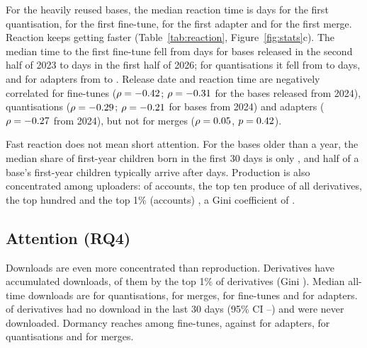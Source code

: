 \documentclass[11pt]{article}
\newcommand{\RQ}[1]{\textbf{RQ#1}}
\begin{document}
For the \nMajorBases heavily reused bases, the median reaction time is \rtQuantAll days for the first quantisation, \rtFinetuneAll for the first fine-tune, \rtAdapterAll for the first adapter and \rtMergeAll for the first merge. Reaction keeps getting faster (Table~\ref{tab:reaction}, Figure~\ref{fig:stats}c). The median time to the first fine-tune fell from \rtFinetuneEarly days for bases released in the second half of 2023 to \rtFinetuneLate days in the first half of 2026; for quantisations it fell from \rtQuantEarly to \rtQuantLate days, and for adapters from \rtAdapterEarly to \rtAdapterLate. Release date and reaction time are negatively correlated for fine-tunes ($\rho=-0.42$; $\rho=-0.31$ for the \nRhoFinetune bases released from 2024), quantisations ($\rho=-0.29$; $\rho=-0.21$ for \nRhoQuant bases from 2024) and adapters ($\rho=-0.27$ from 2024), but not for merges ($\rho=0.05$, $p=0.42$).

\begin{table}[t]
\centering\small
\caption{Median days from a base's release to its first child of each kind, by release cohort (bases with at least 100 direct children).}
\label{tab:reaction}

\end{table}

Fast reaction does not mean short attention. For the \nDecayBases bases older than a year, the median share of first-year children born in the first 30 days is only \pctFirstMonth, and half of a base's first-year children typically arrive after \halfLife days. Production is also concentrated among uploaders: of \nUploaders accounts, the top ten produce \pctTopTenUploaders of all derivatives, the top hundred \pctTopHundredUploaders and the top 1\% (\nTopUploaders accounts) \pctTopUploaders, a Gini coefficient of \giniUploaders.

\subsection{Attention (\RQ4)}
Downloads are even more concentrated than reproduction. Derivatives have accumulated \totalChildDownloads downloads, \pctTopDownloads of them by the top 1\% of derivatives (Gini \giniDownloads). Median all-time downloads are \dlQuantized for quantisations, \dlMerge for merges, \dlFinetune for fine-tunes and \dlAdapter for adapters. \pctDormant of derivatives had no download in the last 30 days (95\% CI \dormantLo--\dormantHi) and \pctZeroAll were never downloaded. Dormancy reaches \pctDormantFinetune among fine-tunes, against \pctDormantAdapter for adapters, \pctDormantQuantized for quantisations and \pctDormantMerge for merges.
\end{document}
